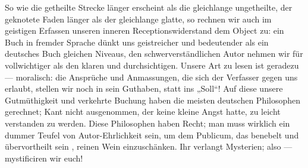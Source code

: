 So wie die getheilte Strecke länger erscheint als die gleichlange ungetheilte, der geknotete Faden länger als der gleichlange glatte, so rechnen wir auch im geistigen Erfassen unseren inneren Receptionswiderstand dem Object zu: ein Buch in fremder Sprache dünkt uns geistreicher und bedeutender als ein deutsches Buch gleichen Niveaus, den schwerverständlichen Autor nehmen wir für vollwichtiger als den klaren und durchsichtigen. Unsere Art zu lesen ist geradezu — moralisch: die Ansprüche und Anmassungen, die sich der Verfasser gegen uns erlaubt, stellen wir noch in sein Guthaben, statt ins „Soll“! Auf diese unsere Gutmüthigkeit und verkehrte Buchung haben die meisten deutschen Philosophen gerechnet; Kant nicht ausgenommen, der keine kleine Angst hatte, zu leicht verstanden zu werden. Diese Philosophen haben Recht; man muss wirklich ein dummer Teufel von Autor-Ehrlichkeit sein, um dem Publicum, das benebelt und übervortheilt sein , reinen Wein einzuschänken. Ihr verlangt Mysterien; also — mystificiren wir euch!
\par

